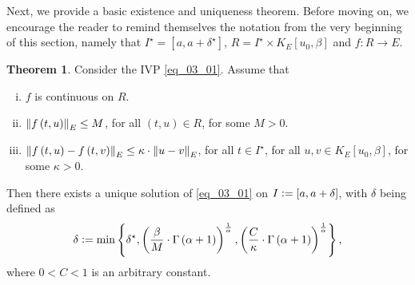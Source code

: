 \documentclass[reqno]{amsart}
\numberwithin{equation}{section}
\theoremstyle{definition}
\newtheorem{theorem}{Theorem}
\theoremstyle{remark}
\newcommand{\ball}[3]{K_{#1}\sbr{#2,#3}}
\newcommand{\br}[1]{\left(#1\right)}
\newcommand{\cbr}[1]{\left\{#1\right\}}
\newcommand{\defeq}{\vcentcolon=}
\newcommand{\sbr}[1]{\left[#1\right]}
\newcommand{\sdelta}{\delta^{\star}}
\newcommand{\sI}{I^{\star}}
\newcommand{\st}{\!:}
\begin{document}
	Next, we provide a basic existence and uniqueness theorem. Before moving on, we encourage the reader to remind themselves the notation from the very beginning of this section, namely that $\sI=\sbr{a,a+\sdelta}$, $R=\sI\times\ball{E}{u_0}{\beta}$ and $f\st{R}\rightarrow{E}$.
	\begin{theorem}
		Consider the IVP \eqref{eq_03_01}. Assume that
		\begin{enumerate}[(i)]
			\item $f$ is continuous on $R$.
			\item $\norm{f\br{t,u}}_E\leq{M}$, for all $\br{t,u}\in{R}$, for some $M>0$.
			\item $\norm{f\br{t,u}-f\br{t,v}}_E\leq\kappa\cdot\norm{u-v}_E$, for all $t\in\sI$, for all $u,v\in\ball{E}{u_0}{\beta}$, for some $\kappa>0$.\label{th_03_02_ass_03}
		\end{enumerate}
		Then there exists a unique solution of \eqref{eq_03_01} on $I\defeq\sbr{a,a+\delta}$, with $\delta$ being defined as
		\begin{equation}\label{eq_03_26}
			\delta\defeq\min\cbr{\sdelta,\br{\frac{\beta}{M}\cdot\Gamma\br{\alpha+1}}^{\frac{1}{\alpha}},\br{\frac{C}{\kappa}\cdot\Gamma\br{\alpha+1}}^{\frac{1}{\alpha}}},
		\end{equation}
		where $0<C<1$ is an arbitrary constant.
	\end{theorem}
\end{document}
